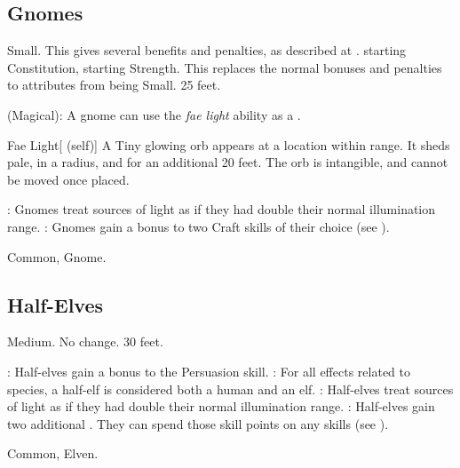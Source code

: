 \subsection{Gnomes}
 Small. This gives several benefits and penalties, as described at .
  starting Constitution,  starting Strength. This replaces the normal bonuses and penalties to attributes from being Small.
 25 feet.
\begin{itemize}
     (Magical): A gnome can use the \textit{fae light} ability as a .
        \begin{attuneability}{Fae Light}[ (self)]
            A Tiny glowing orb appears at a location within \rngmed range.
            It sheds pale,  in a \areasmall radius, and  for an additional 20 feet.
            The orb is intangible, and cannot be moved once placed.
        \end{attuneability}
    : Gnomes treat sources of light as if they had double their normal illumination range.
    : Gnomes gain a  bonus to two Craft skills of their choice (see ).
\end{itemize}
 Common, Gnome.

\subsection{Half-Elves}\label{Half-Elves}
 Medium.
 No change.
 30 feet.
\begin{itemize}
    : Half-elves gain a  bonus to the Persuasion skill.
    : For all effects related to species, a half-elf is considered both a human and an elf.
    : Half-elves treat sources of light as if they had double their normal illumination range.
    : Half-elves gain two additional . They can spend those skill points on any skills (see ).
\end{itemize}
 Common, Elven.


